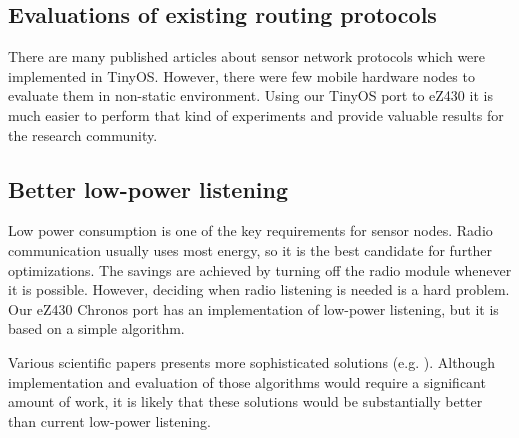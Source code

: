 \subsection{Evaluations of existing routing protocols}
There are many published articles about sensor network protocols which were implemented in TinyOS.
However, there were few mobile hardware nodes to evaluate them in non-static environment.
Using our TinyOS port to eZ430 it is much easier to perform that kind of experiments and provide valuable results for the research community.

\subsection{Better low-power listening}
Low power consumption is one of the key requirements for sensor nodes.
Radio communication usually uses most energy, so it is the best candidate for further optimizations.
The savings are achieved by turning off the radio module whenever it is possible.
However, deciding when radio listening is needed is a hard problem.
Our eZ430 Chronos port has an implementation of low-power listening, but it is based on a simple algorithm.

Various scientific papers presents more sophisticated solutions (e.g. \cite{DCCLPL}).
Although implementation and evaluation of those algorithms would require a significant amount of work, it is likely that these solutions would be substantially better than current low-power listening.


